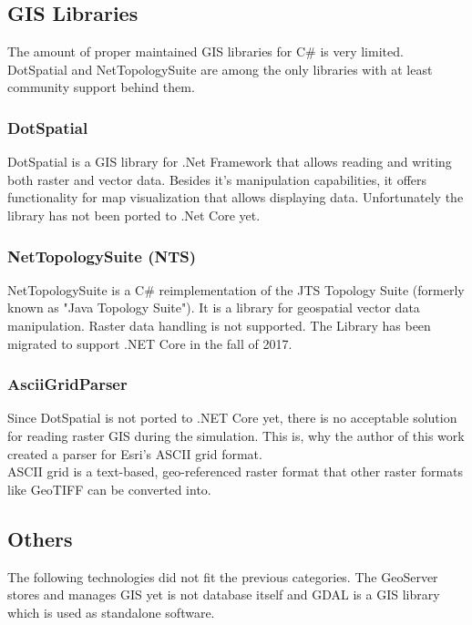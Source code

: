 \subsection{GIS Libraries}
The amount of proper maintained GIS libraries for C\# is very limited. DotSpatial and NetTopologySuite are among the only libraries with at least community support behind them.

\subsubsection{DotSpatial}
DotSpatial is a GIS library for .Net Framework that allows reading and writing both raster and vector data. Besides it's manipulation capabilities, it offers functionality for map visualization that allows displaying data. Unfortunately the library has not been ported to .Net Core yet.

\subsubsection{NetTopologySuite (NTS)}
NetTopologySuite is a C\# reimplementation of the JTS Topology Suite (formerly known as "Java Topology Suite"). It is a library for geospatial vector data manipulation. Raster data handling is not supported. The Library has been migrated to support .NET Core in the fall of 2017.

\subsubsection{AsciiGridParser}
Since DotSpatial is not ported to .NET Core yet, there is no acceptable solution for reading raster GIS during the simulation. This is, why the author of this work created a parser for Esri's ASCII grid format.\\
ASCII grid is a text-based, geo-referenced raster format that other raster formats like GeoTIFF can be converted into.


\subsection{Others}
The following technologies did not fit the previous categories. The GeoServer stores and manages GIS yet is not database itself and GDAL is a GIS library which is used as standalone software.

